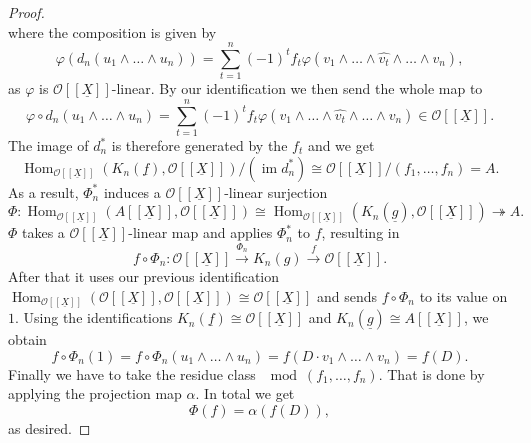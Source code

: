 \documentclass{article}
\theoremstyle{plain}%
\theoremstyle{definition}
\theoremstyle{remark}
\newcommand{\im}{\operatorname{im}}
\renewcommand{\hom}{\operatorname{Hom}}
\begin{document}
\begin{proof}
\[    \]
    where the composition is given by 
    \[
        \varphi(d_n(u_1 \wedge \dots \wedge u_n)) = \sum_{t=1}^n (-1)^t f_t 
        \varphi(v_1 \wedge \dots \wedge \widehat{v_t} \wedge \dots \wedge v_n), 
    \]
    as \(\varphi\) is \(\mathcal{O}[[\underline{X}]]\)-linear.
    By our identification we then send the whole map to 
    \[
        \varphi \circ d_n(u_1\wedge\dots\wedge u_n) = \sum_{t=1}^n (-1)^t f_t 
        \varphi(v_1 \wedge \dots \wedge \widehat{v_t} \wedge \dots \wedge v_n) \in \mathcal{O}[[\underline{X}]].
    \]
    The image of \(d_n^*\) is therefore generated by the \(f_t\) and we get 
    \[
        \hom_{\mathcal{O}[[\underline{X}]]}(K_n(\underline{f}), \mathcal{O}[[\underline{X}]])/(\im d_n^*) 
        \cong \mathcal{O}[[\underline{X}]]/(f_1, \dots, f_n) = A.
    \]
    As a result, \(\Phi_n^*\) induces a \(\mathcal{O}[[\underline{X}]]\)-linear surjection
    \[
        \Phi\colon \hom_{\mathcal{O}[[\underline{X}]]}(A[[\underline{X}]], \mathcal{O}[[\underline{X}]]) \cong 
        \hom_{\mathcal{O}[[\underline{X}]]}(K_n(\underline{g}), \mathcal{O}[[\underline{X}]]) \twoheadrightarrow A.
    \]
    \(\Phi\) takes a \(\mathcal{O}[[\underline{X}]]\)-linear map and applies \(\Phi_n^*\) to \(f\), resulting in 
    \[
        f \circ \Phi_n\colon \mathcal{O}[[\underline{X}]] \xrightarrow{\Phi_n} K_n(g) 
        \xrightarrow{f} \mathcal{O}[[\underline{X}]].
    \]
    After that it uses our previous identification 
    \(\hom_{\mathcal{O}[[\underline{X}]]}(\mathcal{O}[[\underline{X}]], \mathcal{O}[[\underline{X}]])
    \cong \mathcal{O}[[\underline{X}]]\) 
    and sends \(f \circ \Phi_n\) to its value on \(1\). Using the identifications 
    \(K_n(\underline{f})\cong \mathcal{O}[[\underline{X}]]\) and \(K_n(\underline{g})\cong A[[\underline{X}]]\), we obtain
    \[
        f \circ \Phi_n(1) = f \circ \Phi_n(u_1\wedge\dots\wedge u_n) = f(D\cdot v_1\wedge\dots\wedge v_n) = f(D).
    \]
    Finally we have to take the residue class \(\!\!\!\mod (f_1, \dots, f_n)\). 
    That is done by applying the projection map \(\alpha\). In total we get
    \[
        \Phi(f) = \alpha(f(D)),  
    \]
    as desired.
\end{proof}
\end{document}
